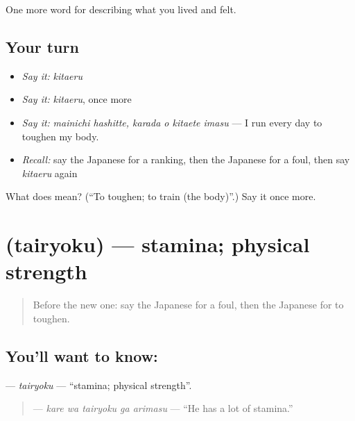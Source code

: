 \begin{grammarlens}[title={What you've built}]
One more word for describing what you lived and felt.
\end{grammarlens}

\subsection*{Your turn}
\begin{itemize}
\raggedright
  \item \emph{Say it:} \emph{kitaeru}
  \item \emph{Say it:} \emph{kitaeru}, once more
  \item \emph{Say it:} \emph{mainichi hashitte, karada o kitaete imasu} — I run every day to toughen my body.
  \item \emph{Recall:} say the Japanese for a ranking, then the Japanese for a foul, then say \emph{kitaeru} again
\end{itemize}

\begin{tcolorbox}[breakable,colback=teal!4,colframe=teal!35!black,title={Before you move on}]
What does  mean? (\textquotedblleft{}To toughen; to train (the body)\textquotedblright{}.) Say it once more.
\end{tcolorbox}
\section[\texorpdfstring{\ja{たいりょく} (tairyoku)}{たいりょく (tairyoku)}]{ (tairyoku) — stamina; physical strength}

\label{lesson:JA-C463-tairyoku}



\begin{quote}
Before the new one: say the Japanese for a foul, then the Japanese for to toughen.
\end{quote}

\subsection*{You'll want to know: }
\textbf{} — \emph{tairyoku} — \textquotedblleft{}stamina; physical strength\textquotedblright{}.

\begin{quote}
\textbf{  } — \emph{kare wa tairyoku ga arimasu} — \textquotedblleft{}He has a lot of stamina.\textquotedblright{}
\end{quote}

